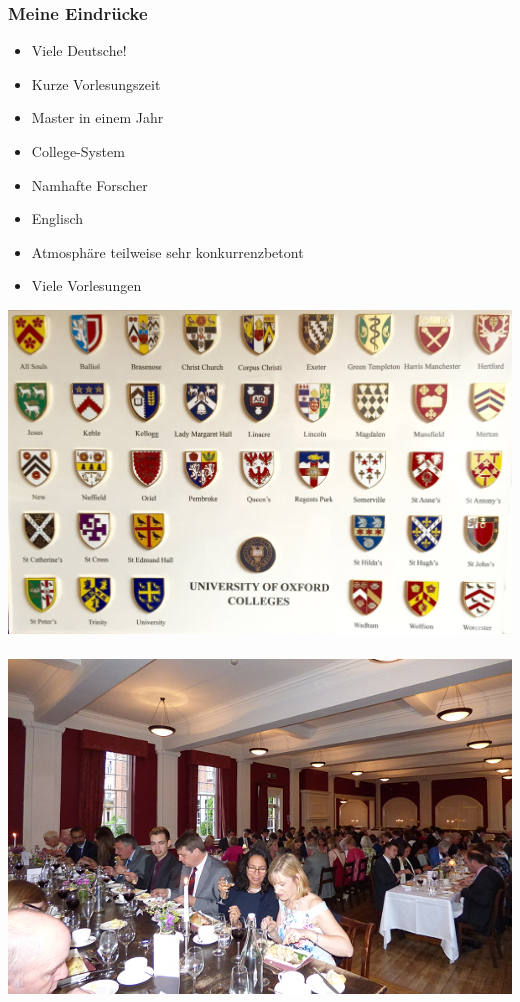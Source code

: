 \documentclass{beamer}
\begin{document}
\begin{frame}
    \frametitle{Meine Eindrücke}

    \begin{minipage}{0.5\textwidth}
        \begin{itemize}
            \item Viele Deutsche!
            \item Kurze Vorlesungszeit
            \item Master in einem Jahr
            \item College-System
            \item Namhafte Forscher
            \item Englisch
            \item Atmosphäre teilweise sehr konkurrenzbetont
            \item Viele Vorlesungen
        \end{itemize}
    \end{minipage}%
    \begin{minipage}{0.5\textwidth}
        \includegraphics[width = \textwidth]{colleges.png}
        ~\\
        \includegraphics[width = \textwidth]{formals.png}
    \end{minipage}%
\end{frame}
\end{document}
